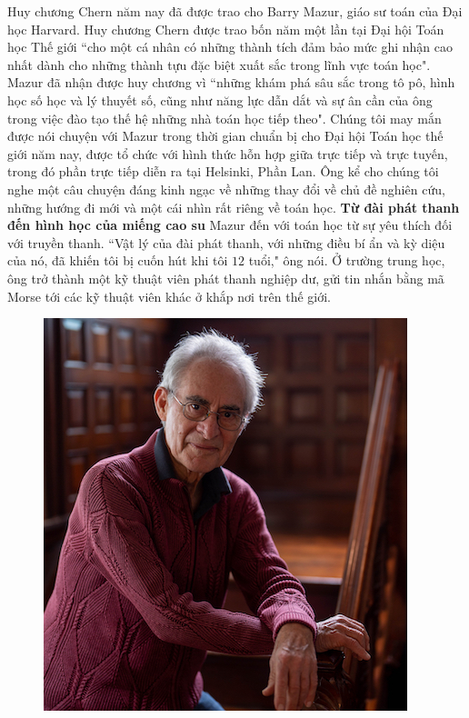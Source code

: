 \begin{multicols}{2}	
	Huy chương Chern năm nay đã được trao cho Barry Mazur, giáo sư toán của Đại học Harvard. Huy chương Chern được trao bốn năm một lần tại Đại hội Toán học Thế giới ``cho một cá nhân có những thành tích đảm bảo mức ghi nhận cao nhất dành cho những thành tựu đặc biệt xuất sắc trong lĩnh vực toán học".
	\vskip 0.05cm
	Mazur đã nhận được huy chương vì ``những khám phá sâu sắc trong tô pô, hình học số học và lý thuyết số, cũng như năng lực dẫn dắt và sự ân cần của ông trong việc đào tạo thế hệ những nhà toán học tiếp theo".
	\vskip 0.05cm
	Chúng tôi may mắn được nói chuyện với Mazur trong thời gian chuẩn bị cho Đại hội Toán học thế giới năm nay, được tổ chức với hình thức hỗn hợp giữa trực tiếp và trực tuyến, trong đó phần trực tiếp diễn ra tại Helsinki, Phần Lan. Ông kể cho chúng tôi nghe một câu chuyện đáng kinh ngạc về những thay đổi về chủ đề nghiên cứu, những hướng đi mới và một cái nhìn rất riêng về toán học.
	\vskip 0.05cm
	\textbf{\color{duongvaotoanhoc}Từ đài phát thanh đến hình học của miếng cao su}
	\vskip 0.05cm
	Mazur đến với toán học từ sự yêu thích đối với truyền thanh. ``Vật lý của đài phát thanh, với những điều bí ẩn và kỳ diệu của nó, đã khiến tôi bị cuốn hút khi tôi $12$ tuổi," ông nói. Ở trường trung học, ông trở thành một kỹ thuật viên phát thanh nghiệp dư, gửi tin nhắn bằng mã Morse tới các kỹ thuật viên khác ở khắp nơi trên thế giới.
	\begin{figure}[H]
		\centering
		\vspace*{-5pt}
		\captionsetup{labelformat= empty, justification=centering}
		\includegraphics[width=0.8\linewidth]{1}

\end{figure}
\end{multicols}
